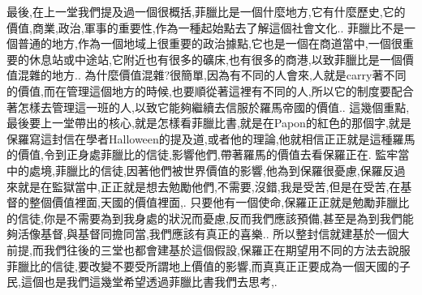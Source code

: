\documentclass{book}
\begin{document}
最後,在上一堂我們提及過一個很概括,菲臘比是一個什麼地方,它有什麼歷史,它的價值,商業,政治,軍事的重要性,作為一種起始點去了解這個社會文化..
菲臘比不是一個普通的地方,作為一個地域上很重要的政治據點,它也是一個在商道當中,一個很重要的休息站或中途站,它附近也有很多的礦床,也有很多的商港,以致菲臘比是一個價值混雜的地方..
為什麼價值混雜?很簡單,因為有不同的人會來,人就是carry著不同的價值,而在管理這個地方的時候,也要順從著這裡有不同的人,所以它的制度要配合著怎樣去管理這一班的人,以致它能夠繼續去信服於羅馬帝國的價值..
這幾個重點,最後要上一堂帶出的核心,就是怎樣看菲臘比書,就是在Papon的紅色的那個字,就是保羅寫這封信在學者Halloween的提及道,或者他的理論,他就相信正正就是這種羅馬的價值,令到正身處菲臘比的信徒,影響他們,帶著羅馬的價值去看保羅正在.
監牢當中的處境,菲臘比的信徒,因著他們被世界價值的影響,他為到保羅很憂慮,保羅反過來就是在監獄當中,正正就是想去勉勵他們,不需要,沒錯,我是受苦,但是在受苦,在基督的整個價值裡面,天國的價值裡面,.
只要他有一個使命,保羅正正就是勉勵菲臘比的信徒,你是不需要為到我身處的狀況而憂慮,反而我們應該預備,甚至是為到我們能夠活像基督,與基督同擔同當,我們應該有真正的喜樂..
所以整封信就建基於一個大前提,而我們往後的三堂也都會建基於這個假設,保羅正在期望用不同的方法去說服菲臘比的信徒,要改變不要受所謂地上價值的影響,而真真正正要成為一個天國的子民,這個也是我們這幾堂希望透過菲臘比書我們去思考,.
\end{document}
